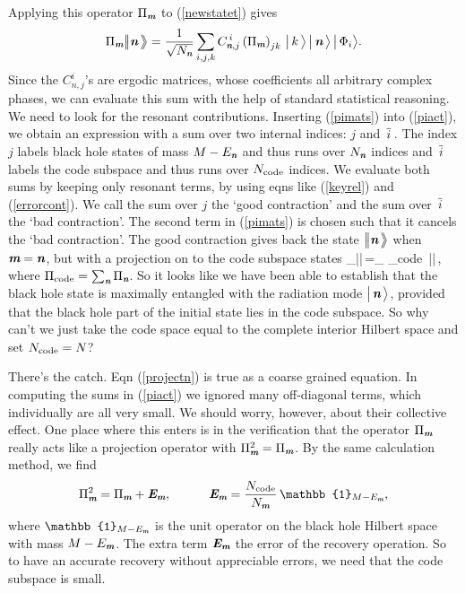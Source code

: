 \documentclass[12pt]{article}%
\def\be{\begin{equation}}
\def\ee{\end{equation}}
\begin{document}
Applying this operator $\Pi_{ \textit{\textbf m}}$ to (\ref{newstatet}) gives 
\be
\label{piact}
\Pi_{\mom}\bigl|\!\bigl|\nom \,\bigr\rangle\!\!\bigr\rangle = {1\over \sqrt{N_\nom}}\sum_{i, j,k} C^{\,i}_{\nom, j} \left(\Pi_{\mom}\right)_{jk}  \,\bigl| \,k\,\bigr \rangle \,\bigl| \,\nom\,\bigr \rangle\, \bigl| \,\Phi_i\bigr \rangle.
\ee
Since the $C_{n,j}^i$'s are ergodic matrices, whose coefficients all arbitrary complex phases, we can evaluate this sum with the help of standard statistical reasoning. We need to look for the resonant contributions. Inserting (\ref{pimats}) into (\ref{piact}), we obtain an expression with a sum over two internal indices: $j$ and ${\, {\overline{i}}\, }$. The index $j$ 
labels black hole states of mass $M-E_{ \textit{\textbf n}}$ and thus runs over $N_{ \textit{\textbf n}}$ indices and ${\, {\overline{i}}\, }$ labels the code subspace and thus runs over ${N_{\rm code}}$ indices.
We evaluate both sums  by keeping only resonant terms, by using eqns  like (\ref{keyrel}) and (\ref{errorcont}).  
We call the sum over $j$ the `good contraction' and
the sum over ${\, {\overline{i}}\, }$ the `bad contraction'. The second term in (\ref{pimats}) is chosen such that it cancels the `bad contraction'.
The good contraction gives back the state $\bigl|\!\bigl|{ \textit{\textbf n}} \,\bigr\rangle\!\!\bigr\rangle $ when ${ \textit{\textbf m}}={ \textit{\textbf n}}$, but with a projection on to the code subspace states 
\bea
\label{projectn}
\Pi_{\mom}\bigl|\!\bigl|\nom \,\bigr\rangle\!\!\bigr\rangle =\delta_{\mom\nom} \Pi_{\rm code}\, \bigl|\!\bigl|\nom \,\bigr\rangle\!\!\bigr\rangle, %
\eea
where $\Pi_{\rm code} = \sum_{{ \textit{\textbf n}}} \Pi_{ \textit{\textbf n}}$. So it looks like we have been
able to establish that the black hole state is maximally entangled with the radiation mode $\bigl|\, { \textit{\textbf n}}\, \bigr\rangle$, provided that the black hole part of the initial state lies in
the code subspace. So why can't we just take the code space equal to the complete interior Hilbert space and set ${N_{\rm code}} = N$?

There's the catch. Eqn (\ref{projectn}) is true as a coarse grained equation. In computing the sums in (\ref{piact}) we ignored many off-diagonal 
terms, which individually are all very small. We should worry, however, about their collective effect. One place where this enters is in the
verification that the operator $\Pi_{ \textit{\textbf m}}$ really acts like a projection operator with $\Pi_{ \textit{\textbf m}}^2 = \Pi_{ \textit{\textbf m}}$. By the same calculation method,
we find
\be
\label{newerror}
\Pi_\mom^2 = \Pi_\mom +\Error_\mom , \qquad \quad
\Error_\mom = \frac{{N_{\rm code}}}{N_\mom} \, \mathbb{1}_{M-E_\mom},
\ee
where $\mathbb{1}_{M-E_\mom}$ is the unit operator on the black hole Hilbert space with mass $M-E_{ \textit{\textbf m}}$. The extra term  $\mbox{\textit{\textbf{E}\!\,}}_{ \textit{\textbf m}}$
the error of the recovery operation. So to have an accurate recovery without appreciable errors, we need that the code subspace is small.
\end{document}
